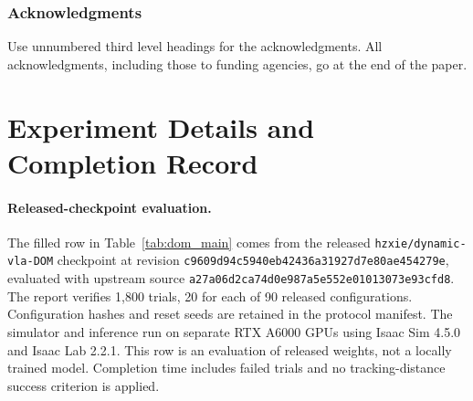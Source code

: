 \documentclass[10pt,twocolumn,letterpaper]{article}
\begin{document}
\subsubsection*{Acknowledgments}
Use unnumbered third level headings for the acknowledgments. All
acknowledgments, including those to funding agencies, go at the end of the paper.





\appendix
\section{Experiment Details and Completion Record}
\label{app:experiment_details}

\paragraph{Released-checkpoint evaluation.}
The filled row in Table~\ref{tab:dom_main} comes from the released
\texttt{hzxie/dynamic-vla-DOM} checkpoint at revision
\texttt{c9609d94c5940eb42436a31927d7e80ae454279e}, evaluated with upstream source
\texttt{a27a06d2ca74d0e987a5e552e01013073e93cfd8}. The report verifies 1,800 trials,
20 for each of 90 released configurations. Configuration hashes and reset seeds
are retained in the protocol manifest. The simulator and inference run on
separate RTX A6000 GPUs using Isaac Sim 4.5.0 and Isaac Lab 2.2.1. This row is an
evaluation of released weights, not a locally trained model. Completion time
includes failed trials and no tracking-distance success criterion is applied.
\end{document}

